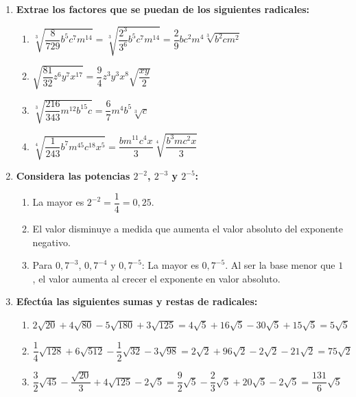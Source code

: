 \documentclass[a4paper,12pt]{article}
\begin{document}
\begin{enumerate}
    \item \textbf{Extrae los factores que se puedan de los siguientes radicales:}
        \begin{enumerate}[label=\alph*)]
            \item $\sqrt[3]{\dfrac{8}{729} b^{5} c^{7} m^{14}} = \sqrt[3]{\dfrac{2^{3}}{3^{6}} b^{5} c^{7} m^{14}} = \dfrac{2}{9} b c^{2} m^{4} \sqrt[3]{b^{2} c m^{2}}$
            \item $\sqrt{\dfrac{81}{32} z^{6} y^{7} x^{17}} = \dfrac{9}{4} z^{3} y^{3} x^{8} \sqrt{\dfrac{x y}{2}}$
            \item $\sqrt[3]{\dfrac{216}{343} m^{12} b^{15} c} = \dfrac{6}{7} m^{4} b^{5} \sqrt[3]{c}$
            \item $\sqrt[4]{\dfrac{1}{243} b^{7} m^{45} c^{18} x^{5}} = \dfrac{b m^{11} c^{4} x}{3} \sqrt[4]{\dfrac{b^{3} m c^{2} x}{3}}$
        \end{enumerate}

    \item \textbf{Considera las potencias $2^{-2}$, $2^{-3}$ y $2^{-5}$:}
        \begin{enumerate}[label=\alph*)]
            \item La mayor es $2^{-2} = \dfrac{1}{4} = 0,25$.
            \item El valor disminuye a medida que aumenta el valor absoluto del exponente negativo.
            \item Para $0,7^{-3}$, $0,7^{-4}$ y $0,7^{-5}$: La mayor es $0,7^{-5}$. Al ser la base menor que $1$, el valor aumenta al crecer el exponente en valor absoluto.
        \end{enumerate}

    \item \textbf{Efectúa las siguientes sumas y restas de radicales:}
        \begin{enumerate}[label=\alph*)]
            \item $2\sqrt{20} + 4\sqrt{80} - 5\sqrt{180} + 3\sqrt{125} = 4\sqrt{5} + 16\sqrt{5} - 30\sqrt{5} + 15\sqrt{5} = 5\sqrt{5}$
            \item $\dfrac{1}{4}\sqrt{128} + 6\sqrt{512} - \dfrac{1}{2}\sqrt{32} - 3\sqrt{98} = 2\sqrt{2} + 96\sqrt{2} - 2\sqrt{2} - 21\sqrt{2} = 75\sqrt{2}$
            \item $\dfrac{3}{2}\sqrt{45} - \dfrac{\sqrt{20}}{3} + 4\sqrt{125} - 2\sqrt{5} = \dfrac{9}{2}\sqrt{5} - \dfrac{2}{3}\sqrt{5} + 20\sqrt{5} - 2\sqrt{5} = \dfrac{131}{6}\sqrt{5}$
        \end{enumerate}


\end{enumerate}
\end{document}
